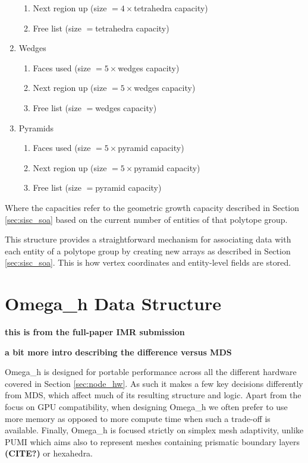 \begin{enumerate}
\begin{enumerate}
  \item Next region up (size $=4\times$tetrahedra capacity)
  \item Free list (size $=$tetrahedra capacity)
  \end{enumerate}
\item Wedges
  \begin{enumerate}
  \item Faces used (size $=5\times$wedges capacity)
  \item Next region up (size $=5\times$wedges capacity)
  \item Free list (size $=$wedges capacity)
  \end{enumerate}
\item Pyramids
  \begin{enumerate}
  \item Faces used (size $=5\times$pyramid capacity)
  \item Next region up (size $=5\times$pyramid capacity)
  \item Free list (size $=$pyramid capacity)
  \end{enumerate}
\end{enumerate}
Where the capacities refer to the geometric growth
capacity described in Section \ref{sec:sisc_soa} based
on the current number of entities of that polytope group.

This structure provides a straightforward mechanism for associating
data with each entity of a polytope group by creating
new arrays as described in Section \ref{sec:sisc_soa}.
This is how vertex coordinates and entity-level fields
are stored.

\section{Omega\_h Data Structure}
\label{sec:omega_h-struct}

{\bf this is from the full-paper IMR submission}

{\bf a bit more intro describing the difference
versus MDS}

Omega\_h is designed for portable performance across
all the different hardware covered in Section \ref{sec:node_hw}.
As such it makes a few key decisions differently from MDS,
which affect much of its resulting structure and logic.
Apart from the focus on GPU compatibility, when designing
Omega\_h we often prefer to use more memory as opposed
to more compute time when such a trade-off is available.
Finally, Omega\_h is focused strictly on simplex mesh
adaptivity, unlike PUMI which aims also to represent
meshes containing prismatic boundary layers {\bf (CITE?)}
or hexahedra.

